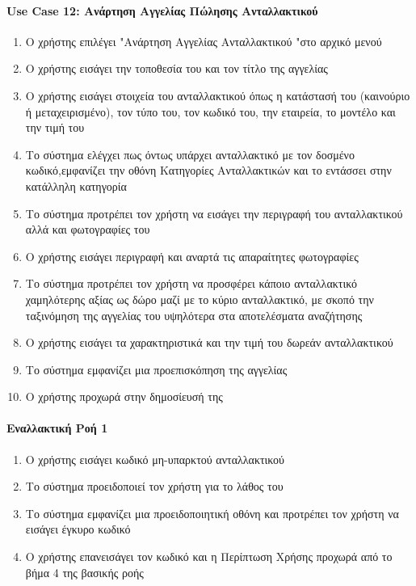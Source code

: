 \documentclass{../ol-softwaremanual}
\begin{document}
	\paragraph{\en Use Case 12: \gr Ανάρτηση Αγγελίας Πώλησης Ανταλλακτικού \gr}
	
	\begin{enumerate}
		\item Ο χρήστης επιλέγει \en"\gr Ανάρτηση Αγγελίας Ανταλλακτικού \en"\gr στο αρχικό μενού
		\item Ο χρήστης εισάγει την τοποθεσία του και τον τίτλο της αγγελίας		
		\item Ο χρήστης εισάγει στοιχεία του ανταλλακτικού όπως η κατάστασή του (καινούριο ή μεταχειρισμένο), τον τύπο του, τον κωδικό του, την εταιρεία, το μοντέλο και την τιμή του
		\item Το σύστημα ελέγχει πως όντως υπάρχει ανταλλακτικό με τον δοσμένο κωδικό,εμφανίζει την οθόνη Κατηγορίες Ανταλλακτικών και το εντάσσει στην κατάλληλη κατηγορία
		\item Το σύστημα προτρέπει τον χρήστη να εισάγει την περιγραφή του ανταλλακτικού αλλά και φωτογραφίες του
		\item Ο χρήστης εισάγει περιγραφή και αναρτά τις απαραίτητες φωτογραφίες
		\item Το σύστημα προτρέπει τον χρήστη να προσφέρει κάποιο ανταλλακτικό χαμηλότερης αξίας ως δώρο μαζί με το κύριο ανταλλακτικό, με σκοπό την ταξινόμηση της αγγελίας του υψηλότερα στα αποτελέσματα αναζήτησης
		\item Ο χρήστης εισάγει τα χαρακτηριστικά και την τιμή του δωρεάν ανταλλακτικού
		\item Το σύστημα εμφανίζει μια προεπισκόπηση της αγγελίας
		\item Ο χρήστης προχωρά στην δημοσίευσή της
	\end{enumerate}
	
	\paragraph{Εναλλακτική Ροή 1}
	
	\begin{enumerate}
		\item Ο χρήστης εισάγει κωδικό μη-υπαρκτού ανταλλακτικού
		\item Το σύστημα προειδοποιεί τον χρήστη για το λάθος του
		\item Το σύστημα εμφανίζει μια προειδοποιητική οθόνη και προτρέπει τον χρήστη να εισάγει έγκυρο κωδικό
		\item Ο χρήστης επανεισάγει τον κωδικό και η Περίπτωση Χρήσης προχωρά από το βήμα 4 της βασικής ροής
	\end{enumerate}
	
\end{document}
